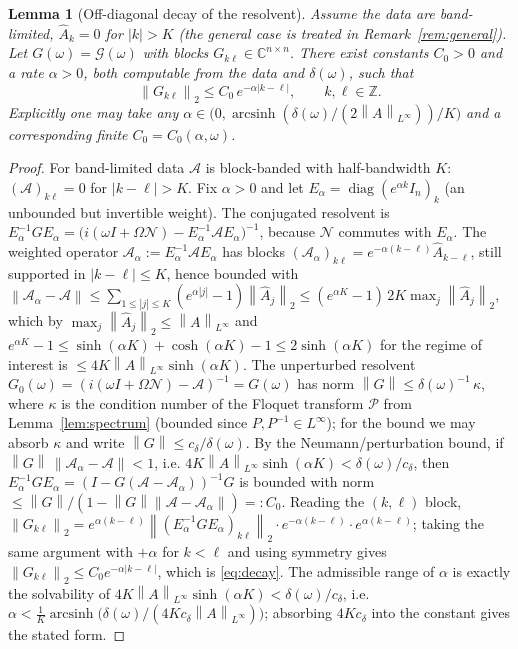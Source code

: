 \documentclass{amsart}
\newtheorem{lemma}{Lemma}
\theoremstyle{definition}
\DeclareMathOperator{\diag}{diag}
\newcommand{\C}{\mathbb{C}}
\newcommand{\Z}{\mathbb{Z}}
\newcommand{\norm}[1]{\left\lVert#1\right\rVert}
\newcommand{\Acal}{\mathcal{A}}
\newcommand{\Ncal}{\mathcal{N}}
\begin{document}
\begin{lemma}[Off-diagonal decay of the resolvent]\label{lem:decay}
Assume the data are \emph{band-limited}, $\hat A_k=0$ for $|k|>K$ (the general
case is treated in Remark~\ref{rem:general}). Let
$G(\omega)=\mathcal G(\omega)$ with blocks $G_{k\ell}\in\C^{n\times n}$. There
exist constants $C_0>0$ and a rate $\alpha>0$, both computable from the data
and $\delta(\omega)$, such that
\begin{equation}\label{eq:decay}
\norm{G_{k\ell}}_2\le C_0\,e^{-\alpha|k-\ell|},\qquad k,\ell\in\Z .
\end{equation}
Explicitly one may take any
$\alpha\in\big(0,\operatorname{arcsinh}(\delta(\omega)/(2\norm{A}_{L^\infty})) /K\big)$
and a corresponding finite $C_0=C_0(\alpha,\omega)$.
\end{lemma}

\begin{proof}
For band-limited data $\Acal$ is block-banded with half-bandwidth $K$:
$(\Acal)_{k\ell}=0$ for $|k-\ell|>K$. Fix $\alpha>0$ and let
$E_\alpha=\diag(e^{\alpha k}I_n)_{k}$ (an unbounded but invertible weight). The
conjugated resolvent is
$E_\alpha^{-1}G E_\alpha=\big(i(\omega I+\Omega\Ncal)-E_\alpha^{-1}\Acal E_\alpha\big)^{-1}$,
because $\Ncal$ commutes with $E_\alpha$. The weighted operator
$\Acal_\alpha:=E_\alpha^{-1}\Acal E_\alpha$ has blocks
$(\Acal_\alpha)_{k\ell}=e^{-\alpha(k-\ell)}\hat A_{k-\ell}$, still supported in
$|k-\ell|\le K$, hence bounded with
$\norm{\Acal_\alpha-\Acal}\le \sum_{1\le|j|\le K}(e^{\alpha|j|}-1)\norm{\hat A_j}_2
\le (e^{\alpha K}-1)\,2K\max_j\norm{\hat A_j}_2$, which by
$\max_j\norm{\hat A_j}_2\le\norm{A}_{L^\infty}$ and $e^{\alpha K}-1\le
\sinh(\alpha K)+\cosh(\alpha K)-1\le 2\sinh(\alpha K)$ for the regime of
interest is $\le 4K\norm{A}_{L^\infty}\sinh(\alpha K)$. The unperturbed
resolvent $G_0(\omega)=(i(\omega I+\Omega\Ncal)-\Acal)^{-1}=G(\omega)$ has norm
$\norm{G}\le \delta(\omega)^{-1}\,\kappa$, where $\kappa$ is the
condition number of the Floquet transform $\mathcal P$ from
Lemma~\ref{lem:spectrum} (bounded since $P,P^{-1}\in L^\infty$); for the bound
we may absorb $\kappa$ and write $\norm{G}\le c_\delta/\delta(\omega)$. By the
Neumann/perturbation bound, if
$\norm{G}\,\norm{\Acal_\alpha-\Acal}<1$, i.e.
$4K\norm{A}_{L^\infty}\sinh(\alpha K)<\delta(\omega)/c_\delta$, then
$E_\alpha^{-1}GE_\alpha=(I-G(\Acal-\Acal_\alpha))^{-1}G$ is bounded with norm
$\le \norm{G}/(1-\norm{G}\norm{\Acal-\Acal_\alpha})=:C_0$. Reading the
$(k,\ell)$ block, $\norm{G_{k\ell}}_2=e^{\alpha(k-\ell)}\norm{(E_\alpha^{-1}GE_\alpha)_{k\ell}}_2
\cdot e^{-\alpha(k-\ell)}\cdot e^{\alpha(k-\ell)}$; taking the same argument with
$+\alpha$ for $k<\ell$ and using symmetry gives
$\norm{G_{k\ell}}_2\le C_0 e^{-\alpha|k-\ell|}$, which is \eqref{eq:decay}. The
admissible range of $\alpha$ is exactly the solvability of
$4K\norm{A}_{L^\infty}\sinh(\alpha K)<\delta(\omega)/c_\delta$, i.e.
$\alpha<\tfrac1K\operatorname{arcsinh}\!\big(\delta(\omega)/(4Kc_\delta\norm{A}_{L^\infty})\big)$;
absorbing $4Kc_\delta$ into the constant gives the stated form.
\end{proof}
\end{document}
